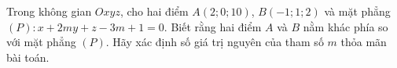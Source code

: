 \begin{ex}
Trong không gian $Oxyz$, cho hai điểm $A(2;0;10)$, $B(-1;1;2)$ và mặt phẳng $(P)\colon x+2my+z-3m+1=0$. Biết rằng hai điểm $A$ và $B$ nằm khác phía so với mặt phẳng $(P)$. Hãy xác định số giá trị nguyên của tham số $m$ thỏa mãn bài toán.
\end{ex}
